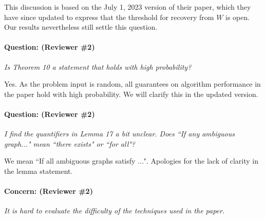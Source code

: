 \documentclass[12pt]{colt2024} %
\begin{document}
This discussion is based on the July 1, 2023 version of their paper, which they have since updated to express that the threshold for recovery from $W$ is open. Our results nevertheless still settle this question.






\paragraph{Question:  (Reviewer \#2)} \emph{Is Theorem 10 a statement that holds with high probability?}

Yes. As the problem input is random, all guarantees on algorithm performance in the paper hold with high probability. We will clarify this in the updated version.


\paragraph{Question:  (Reviewer \#2)} \emph{I find the quantifiers in Lemma 17 a bit unclear. Does ``If any ambiguous graph..." mean ``there exists" or ``for all"?}

We mean ``If all ambiguous graphs satisfy ...". Apologies for the lack of clarity in the lemma statement.


\paragraph{Concern:  (Reviewer \#2)} \emph{It is hard to evaluate the difficulty of the techniques used in the paper.}
\end{document}
